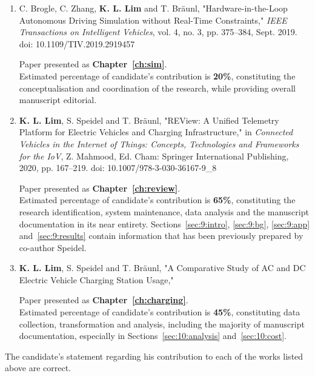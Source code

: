 \begin{enumerate}
	\item C. Brogle, C. Zhang, \textbf{K. L. Lim} and T. Bräunl, "Hardware-in-the-Loop Autonomous Driving Simulation without Real-Time Constraints," \textit{IEEE Transactions on Intelligent Vehicles}, vol. 4, no. 3, pp. 375--384, Sept. 2019. doi: 10.1109/TIV.2019.2919457
	
	Paper presented as \textbf{Chapter~\ref{ch:sim}}. \\
	Estimated percentage of candidate's contribution is \textbf{20\%}, constituting the conceptualisation and coordination of the research, while providing overall manuscript editorial.
	
	\item \textbf{K. L. Lim}, S. Speidel and T. Bräunl, "REView: A Unified Telemetry Platform for Electric Vehicles and Charging Infrastructure," in \textit{Connected Vehicles in the Internet of Things: Concepts, Technologies and Frameworks for the IoV}, Z. Mahmood, Ed. Cham: Springer International Publishing, 2020, pp. 167--219. doi: 10.1007/978-3-030-36167-9\_8
	
	Paper presented as \textbf{Chapter~\ref{ch:review}}. \\
	Estimated percentage of candidate's contribution is \textbf{65\%}, constituting the research identification, system maintenance, data analysis and the manuscript documentation in its near entirety. Sections~\ref{sec:9:intro}, \ref{sec:9:bg}, \ref{sec:9:app} and~\ref{sec:9:results} contain information that has been previously prepared by co-author Speidel.
	
	\item \textbf{K. L. Lim}, S. Speidel and T. Bräunl, "A Comparative Study of AC and DC Electric Vehicle Charging Station Usage,"%
	
	Paper presented as \textbf{Chapter~\ref{ch:charging}}. \\
	Estimated percentage of candidate's contribution is \textbf{45\%}, constituting data collection, transformation and analysis, including the majority of manuscript documentation, especially in Sections~\ref{sec:10:analysis} and~\ref{sec:10:cost}.
\end{enumerate}

\pagebreak

\noindent The candidate's statement regarding his contribution to each of the works listed above are correct.
\vspace{8ex}

